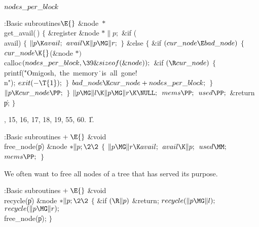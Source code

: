 \B\D$\\{nodes\_per\_block}$ \5
\par
\Y\B\4:Basic subroutines\X${}\E{}$\6
\&{node} ${}{*}{}$\\{get\_avail}(\,)\6
${}\{{}$\1\6
\&{register} \&{node} ${}{*}\|p;{}$\7
\&{if} (\\{avail})\5
${}\{{}$\1\6
${}\|p\K\\{avail};{}$\6
${}\\{avail}\K\|p\MG\|r;{}$\6
\4${}\}{}$\2\6
\&{else}\5
${}\{{}$\1\6
\&{if} ${}(\\{cur\_node}\E\\{bad\_node}){}$\5
${}\{{}$\1\6
${}\\{cur\_node}\K{}$(\&{node} ${}{*}){}$ \\{calloc}${}(\\{nodes\_per\_block},%
\39\&{sizeof}(\&{node}));{}$\6
\&{if} ${}(\R\\{cur\_node}){}$\5
${}\{{}$\1\6
\\{printf}(\.{"Omigosh,\ the\ memory}\)\.{\ is\ all\ gone!\\n"});\6
${}\\{exit}({-}\T{1});{}$\6
\4${}\}{}$\2\6
${}\\{bad\_node}\K\\{cur\_node}+\\{nodes\_per\_block};{}$\6
\4${}\}{}$\2\6
${}\|p\K\\{cur\_node}\PP;{}$\6
\4${}\}{}$\2\6
${}\|p\MG\|l\K\|p\MG\|r\K\NULL;{}$\6
${}\\{mems}\PP;{}$\6
${}\\{used}\PP;{}$\6
\&{return} \|p;\6
\4${}\}{}$\2\par
{}, 15, 16, 17, 18, 19, 55, 60.
\U1.\fi

\B{}:Basic subroutines\X${}\mathrel+\E{}$\6
\&{void} \\{free\_node}(\|p)\1\1\6
\&{node} ${}{*}\|p;\2\2{}$\6
${}\{{}$\1\6
${}\|p\MG\|r\K\\{avail};{}$\6
${}\\{avail}\K\|p;{}$\6
${}\\{used}\MM;{}$\6
${}\\{mems}\PP;{}$\6
\4${}\}{}$\2\par
\fi

We often want to free all nodes of a tree that has served its purpose.

\Y\B\4:Basic subroutines\X${}\mathrel+\E{}$\6
\&{void} \\{recycle}(\|p)\1\1\6
\&{node} ${}{*}\|p;\2\2{}$\6
${}\{{}$\1\6
\&{if} ${}(\R\|p){}$\1\5
\&{return};\2\6
${}\\{recycle}(\|p\MG\|l);{}$\6
${}\\{recycle}(\|p\MG\|r);{}$\6
\\{free\_node}(\|p);\6
\4${}\}{}$\2\par
\fi

